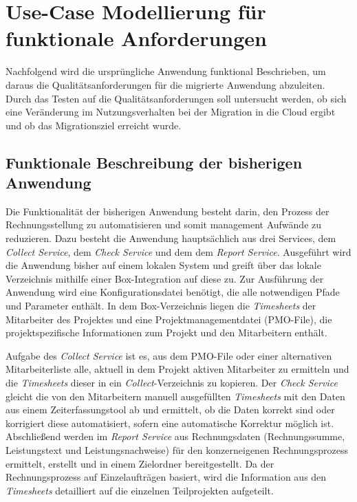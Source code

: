 \section{Use-Case Modellierung für funktionale Anforderungen}
\label{sec:use-case-modellierung}

Nachfolgend wird die ursprüngliche Anwendung funktional Beschrieben, um daraus die Qualitätsanforderungen für die migrierte Anwendung abzuleiten. Durch das Testen auf die Qualitätsanforderungen soll untersucht werden, ob sich eine Veränderung im Nutzungsverhalten bei der Migration in die Cloud ergibt und ob das Migrationsziel erreicht wurde.

\subsection{Funktionale Beschreibung der bisherigen Anwendung}
Die Funktionalität der bisherigen Anwendung besteht darin, den Prozess der Rechnungsstellung zu automatisieren und somit management Aufwände zu reduzieren. Dazu besteht die Anwendung hauptsächlich aus drei Services, dem \textit{Collect Service}, dem \textit{Check Service} und dem dem \textit{Report Service}. Ausgeführt wird die Anwendung bisher auf einem lokalen System und greift über das lokale Verzeichnis mithilfe einer \gls{Box}-Integration auf diese zu. Zur Ausführung der Anwendung wird eine Konfigurationsdatei benötigt, die alle notwendigen Pfade und Parameter enthält. In dem \gls{Box}-Verzeichnis liegen die \textit{\glspl{Timesheet}} der Mitarbeiter des Projektes und eine Projektmanagementdatei (PMO-File), die projektspezifische Informationen zum Projekt und den Mitarbeitern enthält.

Aufgabe des \textit{Collect Service} ist es, aus dem PMO-File oder einer alternativen Mitarbeiterliste alle, aktuell in dem Projekt aktiven Mitarbeiter zu ermitteln und die \textit{\glspl{Timesheet}} dieser in ein \textit{Collect}-Verzeichnis zu kopieren. Der \textit{Check Service} gleicht die von den Mitarbeitern manuell ausgefüllten \textit{\glspl{Timesheet}} mit den Daten aus einem Zeiterfassungstool ab und ermittelt, ob die Daten korrekt sind oder korrigiert diese automatisiert, sofern eine automatische Korrektur möglich ist. Abschließend werden im \textit{Report Service} aus Rechnungsdaten (Rechnungssumme, Leistungstext und Leistungsnachweise) für den konzerneigenen Rechnungsprozess ermittelt, erstellt und in einem Zielordner bereitgestellt. Da der Rechnungsprozess auf Einzelaufträgen basiert, wird die Information aus den \textit{\glspl{Timesheet}} detailliert auf die einzelnen Teilprojekten aufgeteilt.

